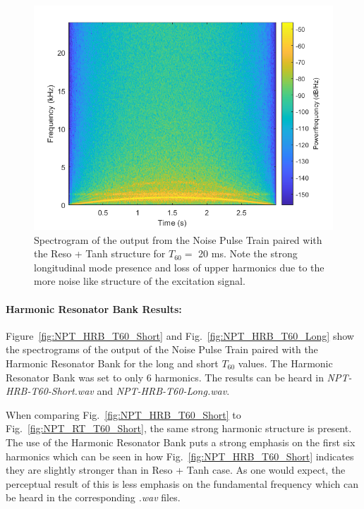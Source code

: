 \documentclass[../main.tex]{subfiles}
\begin{document}
\begin{figure}[h!]
    \centering
    \includegraphics[scale=.60]{./images/plots/NPTResoTanhT60Long.png}
    \caption{Spectrogram of the output from the Noise Pulse Train paired with the Reso + Tanh structure for $T_{60} = $ 20 ms. Note the strong longitudinal mode presence and loss of upper harmonics due to the more noise like structure of the excitation signal.}
    \label{fig:NPT_RT_T60_Long}
\end{figure}

\clearpage

\paragraph{Harmonic Resonator Bank Results:}
Figure~\ref{fig:NPT_HRB_T60_Short} and Fig.~\ref{fig:NPT_HRB_T60_Long} show the spectrograms of the output of the Noise Pulse Train paired with the Harmonic Resonator Bank for the long and short $T_{60}$ values. The Harmonic Resonator Bank was set to only 6 harmonics. The results can be heard in \emph{NPT-HRB-T60-Short.wav} and \emph{NPT-HRB-T60-Long.wav}.

When comparing Fig.~\ref{fig:NPT_HRB_T60_Short} to Fig.~\ref{fig:NPT_RT_T60_Short}, the same strong harmonic structure is present. The use of the Harmonic Resonator Bank puts a strong emphasis on the first six harmonics which can be seen in how Fig.~\ref{fig:NPT_HRB_T60_Short} indicates they are slightly stronger than in Reso + Tanh case. As one would expect, the perceptual result of this is less emphasis on the fundamental frequency which can be heard in the corresponding \emph{.wav} files.
\end{document}
